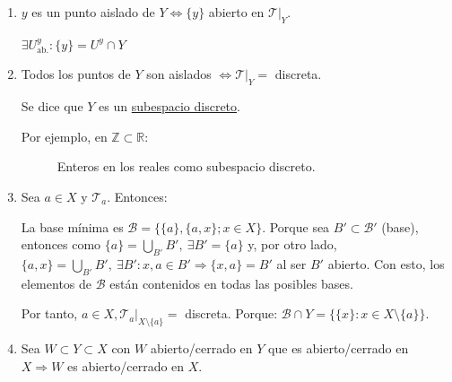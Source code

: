 \begin{ej}
\begin{enumerate}
    \item $y$ es un punto aislado de $Y \Leftrightarrow \{y\}$ abierto en $\mathcal{T}|_Y$.
    \begin{demo}
        $\exists U^y_{\text{ab.}}: \{y\} = U^y \cap Y$
    \end{demo}

    \item Todos los puntos de $Y$ son aislados $\Leftrightarrow \mathcal{T}|_Y = $ discreta.

    Se dice que $Y$ es un \underline{subespacio discreto}. 

    Por ejemplo, en $\mathbb{Z} \subset \mathbb{R}$:    
\begin{figure}[H]
    \centering
    \caption{Enteros en los reales como subespacio discreto.}
    \label{fig:enteros-en-los-reales-como-subespacio-discreto.}
\end{figure}

    \item Sea $a \in X$ y $\mathcal{T}_a$. Entonces:

    La base mínima es $\mathcal{B} = \{\{a\} , \{a, x\}; x \in X\}$. Porque sea $B' \subset \mathcal{B}'$ (base), entonces como $\{a\} = \bigcup_{B'} B',\ \exists B' = \{a\}$ y, por otro lado, $\{a, x\} = \bigcup_{B'} B',\ \exists B': x, a \in B' \Rightarrow \{x, a\} = B'$ al ser $B'$ abierto. Con esto, los elementos de $\mathcal{B}$ están contenidos en todas las posibles bases.

    Por tanto, $a \in X, \mathcal{T}_a|_{X \setminus \{a\}} = $ discreta. Porque: $\mathcal{B} \cap Y = \{\{x\}: x \in X\setminus \{a\}\}$.

    \item Sea $W \subset Y \subset X$ con $W$ abierto/cerrado en $Y$ que es abierto/cerrado en $X \Rightarrow W$ es abierto/cerrado en $X$.


\end{enumerate}
\end{ej}
